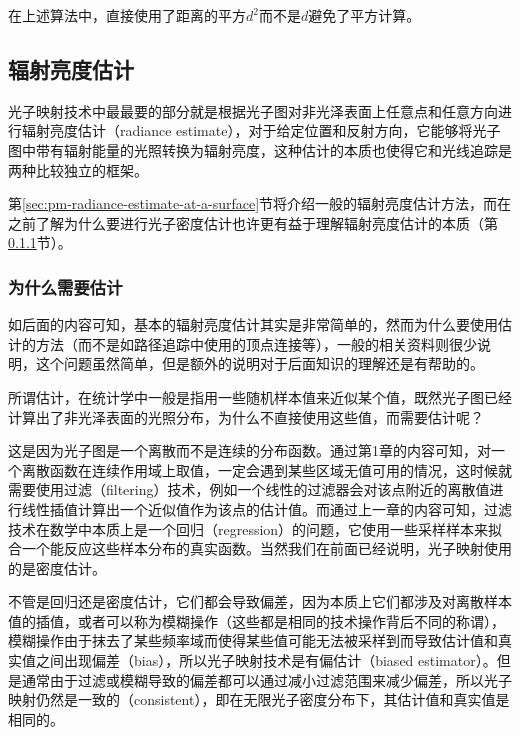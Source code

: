 在上述算法中，直接使用了距离的平方$d^2$而不是$d$避免了平方计算。





\subsection{辐射亮度估计}\label{sec:pm-radiance-estimate}
光子映射技术中最最要的部分就是根据光子图对非光泽表面上任意点和任意方向进行辐射亮度估计（radiance estimate），对于给定位置和反射方向，它能够将光子图中带有辐射能量的光照转换为辐射亮度，这种估计的本质也使得它和光线追踪是两种比较独立的框架。

第\ref{sec:pm-radiance-estimate-at-a-surface}节将介绍一般的辐射亮度估计方法，而在之前了解为什么要进行光子密度估计也许更有益于理解辐射亮度估计的本质（第\ref{sec:pm-why-radiance-estimate}节）。




\subsubsection{为什么需要估计}\label{sec:pm-why-radiance-estimate}
如后面的内容可知，基本的辐射亮度估计其实是非常简单的，然而为什么要使用估计的方法（而不是如路径追踪中使用的顶点连接等），一般的相关资料则很少说明，这个问题虽然简单，但是额外的说明对于后面知识的理解还是有帮助的。

所谓估计，在统计学中一般是指用一些随机样本值来近似某个值，既然光子图已经计算出了非光泽表面的光照分布，为什么不直接使用这些值，而需要估计呢？

这是因为光子图是一个离散而不是连续的分布函数。通过第1章的内容可知，对一个离散函数在连续作用域上取值，一定会遇到某些区域无值可用的情况，这时候就需要使用过滤（filtering）技术，例如一个线性的过滤器会对该点附近的离散值进行线性插值计算出一个近似值作为该点的估计值。而通过上一章的内容可知，过滤技术在数学中本质上是一个回归（regression）的问题，它使用一些采样样本来拟合一个能反应这些样本分布的真实函数。当然我们在前面已经说明，光子映射使用的是密度估计。

不管是回归还是密度估计，它们都会导致偏差，因为本质上它们都涉及对离散样本值的插值，或者可以称为模糊操作（这些都是相同的技术操作背后不同的称谓），模糊操作由于抹去了某些频率域而使得某些值可能无法被采样到而导致估计值和真实值之间出现偏差（bias），所以光子映射技术是有偏估计（biased estimator）。但是通常由于过滤或模糊导致的偏差都可以通过减小过滤范围来减少偏差，所以光子映射仍然是一致的（consistent），即在无限光子密度分布下，其估计值和真实值是相同的。





